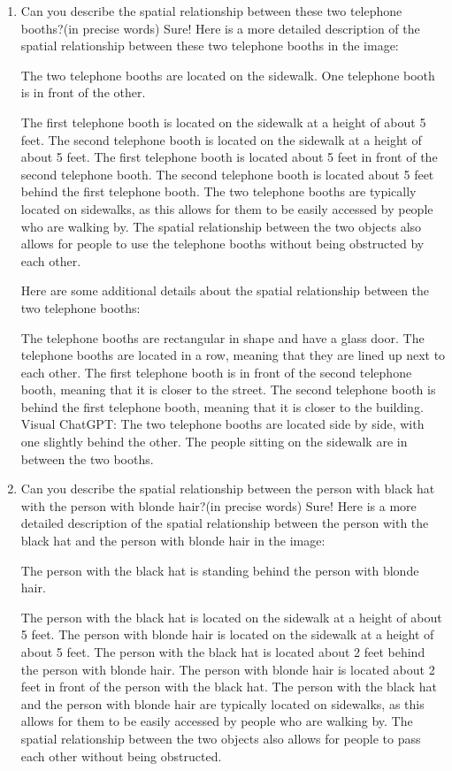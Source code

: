 \begin{enumerate}
    \item Can you describe the spatial relationship between these two telephone booths?(in precise words)
    \subitem 
    Sure! Here is a more detailed description of the spatial relationship between these two telephone booths in the image:
    
    The two telephone booths are located on the sidewalk. One telephone booth is in front of the other.
    
    The first telephone booth is located on the sidewalk at a height of about 5 feet.
    The second telephone booth is located on the sidewalk at a height of about 5 feet.
    The first telephone booth is located about 5 feet in front of the second telephone booth.
    The second telephone booth is located about 5 feet behind the first telephone booth.
    The two telephone booths are typically located on sidewalks, as this allows for them to be easily accessed by people who are walking by. The spatial relationship between the two objects also allows for people to use the telephone booths without being obstructed by each other.
    
    Here are some additional details about the spatial relationship between the two telephone booths:
    
    The telephone booths are rectangular in shape and have a glass door.
    The telephone booths are located in a row, meaning that they are lined up next to each other.
    The first telephone booth is in front of the second telephone booth, meaning that it is closer to the street.
    The second telephone booth is behind the first telephone booth, meaning that it is closer to the building.
    \subitem Visual ChatGPT: The two telephone booths are located side by side, with one slightly behind the other. The people sitting on the sidewalk are in between the two booths.
    \item Can you describe the spatial relationship between the person with black hat with the person with blonde hair?(in precise words)
    \subitem 
    Sure! Here is a more detailed description of the spatial relationship between the person with the black hat and the person with blonde hair in the image:
    
    The person with the black hat is standing behind the person with blonde hair.
    
    The person with the black hat is located on the sidewalk at a height of about 5 feet.
    The person with blonde hair is located on the sidewalk at a height of about 5 feet.
    The person with the black hat is located about 2 feet behind the person with blonde hair.
    The person with blonde hair is located about 2 feet in front of the person with the black hat.
    The person with the black hat and the person with blonde hair are typically located on sidewalks, as this allows for them to be easily accessed by people who are walking by. The spatial relationship between the two objects also allows for people to pass each other without being obstructed.
    

\end{enumerate}
